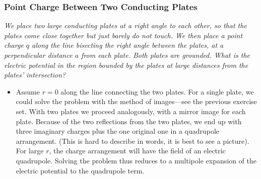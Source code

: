 \documentclass[11pt, a4paper]{article}
\begin{document}
\subsubsection{Point Charge Between Two Conducting Plates}
\textit{We place two large conducting plates at a right angle to each other, so that the plates come close together but just barely do not touch. We then place a point charge $ q $ along the line bisecting the right angle between the plates, at a perpendicular distance $ a $ from each plate. Both plates are grounded. What is the electric potential in the region bounded by the plates at large distances from the plates' intersection?}
\begin{itemize}
	\item Assume $ r = 0 $ along the line connecting the two plates. For a single plate, we could solve the problem with the method of images---see the previous exercise set. With two plates we proceed analogously, with a mirror image for each plate. Because of the two reflections from the two plates, we end up with three imaginary charges plus the one original one in a quadrupole arrangement. (This is hard to describe in words, it is best to see a picture). For large $ r $, the charge arrangement will have the field of an electric quadrupole. Solving the problem thus reduces to a multipole expansion of the electric potential to the quadrupole term.  
\end{itemize}	
	
\end{document}
